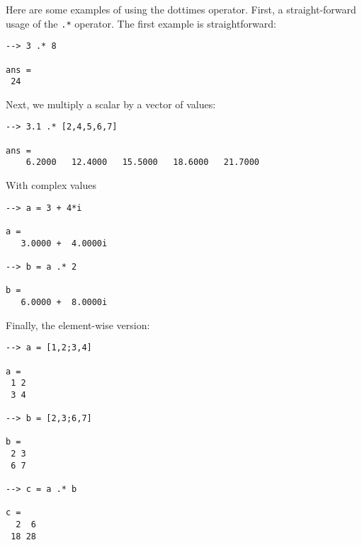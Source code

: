 Here are some examples of using the dottimes operator.  First, a 
straight-forward usage of the \verb|.*| operator.  The first example
is straightforward:
\begin{verbatim}
--> 3 .* 8

ans = 
 24 
\end{verbatim}
Next, we multiply a scalar by a vector of values:
\begin{verbatim}
--> 3.1 .* [2,4,5,6,7]

ans = 
    6.2000   12.4000   15.5000   18.6000   21.7000 
\end{verbatim}
With complex values
\begin{verbatim}
--> a = 3 + 4*i

a = 
   3.0000 +  4.0000i 

--> b = a .* 2

b = 
   6.0000 +  8.0000i 
\end{verbatim}
Finally, the element-wise version:
\begin{verbatim}
--> a = [1,2;3,4]

a = 
 1 2 
 3 4 

--> b = [2,3;6,7]

b = 
 2 3 
 6 7 

--> c = a .* b

c = 
  2  6 
 18 28 
\end{verbatim}

